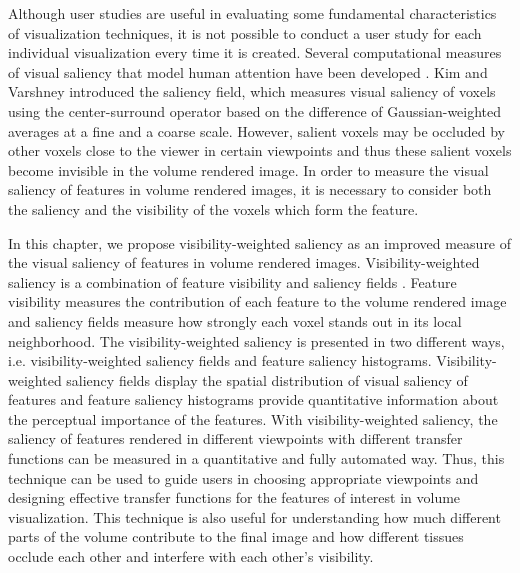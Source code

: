 Although user studies are useful in evaluating some fundamental characteristics of visualization techniques, it is not possible to conduct a user study for each individual visualization every time it is created.
Several computational measures of visual saliency that model human attention have been developed \cite{itti_model_1998} \cite{harel_graph-based_2006}.
Kim and Varshney \cite{kim_saliency-guided_2006} introduced the saliency field, which measures visual saliency of voxels using the center-surround operator based on the difference of Gaussian-weighted averages at a fine and a coarse scale.
However, salient voxels may be occluded by other voxels close to the viewer in certain viewpoints and thus these salient voxels become invisible in the volume rendered image. In order to measure the visual saliency of features in volume rendered images, it is necessary to consider both the saliency and the visibility of the voxels which form the feature.

In this chapter, we propose visibility-weighted saliency as an improved measure of the visual saliency of features in volume rendered images. Visibility-weighted saliency is a combination of feature visibility \cite{wang_efficient_2011} and saliency fields \cite{kim_saliency-guided_2006}.
Feature visibility measures the contribution of each feature to the volume rendered image and saliency fields measure how strongly each voxel stands out in its local neighborhood.
The visibility-weighted saliency is presented in two different ways, i.e. visibility-weighted saliency fields and feature saliency histograms. Visibility-weighted saliency fields display the spatial distribution of visual saliency of features and feature saliency histograms provide quantitative information about the perceptual importance of the features.
With visibility-weighted saliency, the saliency of features rendered in different viewpoints with different transfer functions can be measured in a quantitative and fully automated way.
Thus, this technique can be used to guide users in choosing appropriate viewpoints and designing effective transfer functions for the features of interest in volume visualization.
This technique is also useful for understanding how much different parts of the volume contribute to the final image and how different tissues occlude each other and interfere with each other's visibility.

